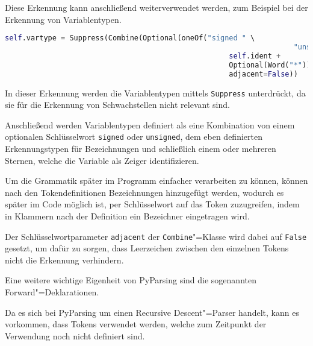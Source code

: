                 Diese Erkennung kann anschließend weiterverwendet werden,
                zum Beispiel bei der Erkennung von Variablentypen.

                \begin{lstlisting}[caption={Erkennung von Variablentypen}, gobble=20, language=python]
                    self.vartype = Suppress(Combine(Optional(oneOf("signed " \
                                                                   "unsigned")) +
                                                    self.ident +
                                                    Optional(Word("*")),
                                                    adjacent=False))
                \end{lstlisting}

                In dieser Erkennung werden die Variablentypen mittels
                \lstinline{Suppress} unterdrückt,
                da sie für die Erkennung von Schwachstellen nicht relevant sind.

                Anschließend werden Variablentypen definiert als eine Kombination von einem optionalen Schlüsselwort
                \lstinline{signed} oder
                \lstinline{unsigned},
                dem eben definierten Erkennungstypen für Bezeichnungen und
                schließlich einem oder
                mehreren Sternen,
                welche die Variable als Zeiger identifizieren.

                Um die Grammatik
                später im Programm einfacher verarbeiten zu können,
                können nach den Tokendefinitionen Bezeichnungen hinzugefügt werden,
                wodurch es
                später im Code möglich ist,
                per Schlüsselwort auf das Token zuzugreifen,
                indem in Klammern nach der Definition ein Bezeichner eingetragen wird.

                Der Schlüsselwortparameter
                \lstinline{adjacent} der
                \lstinline{Combine}"=Klasse wird dabei auf
                \lstinline{False} gesetzt,
                um dafür zu sorgen,
                dass Leerzeichen zwischen den einzelnen Tokens nicht die Erkennung verhindern.

                Eine weitere wichtige Eigenheit von PyParsing sind die sogenannten Forward"=Deklarationen.

                Da es sich bei PyParsing um einen Recursive Descent"=Parser handelt,
                kann es vorkommen,
                dass Tokens verwendet werden,
                welche zum Zeitpunkt der Verwendung noch nicht definiert sind.

